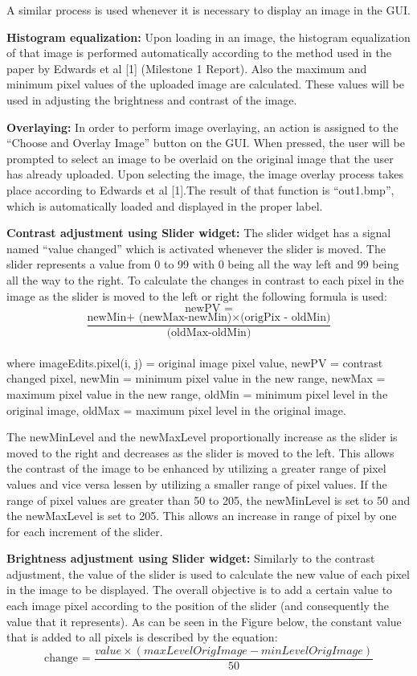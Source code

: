 \documentclass{article}
\begin{document}
\begin{multicols*}{2}
A similar process is used whenever it is necessary to display an image in the GUI.

{\bf Histogram equalization:} 
Upon loading in an image, the histogram equalization of that image is performed automatically according to the method used in the paper by Edwards et al [1] (Milestone 1 Report). Also the maximum and minimum pixel values of the uploaded image are calculated. These values will be used in adjusting the brightness and contrast of the image.

{\bf Overlaying:} 
In order to perform image overlaying, an action is assigned to the “Choose and Overlay Image” button on the GUI. When pressed, the user will be prompted to select an image to be overlaid on the original image that the user has already uploaded. Upon selecting the image, the image overlay process takes place according to  Edwards et al [1].The result of that function is “out1.bmp”, which is automatically loaded and displayed in the proper label.

{\bf Contrast adjustment using Slider widget:} 
The slider widget has a signal named “value changed” which is activated whenever the slider is moved. The slider represents a value from 0 to 99 with 0 being all the way left and 99 being all the way to the right. To calculate the changes in contrast to each pixel in the image as the slider is moved to the left or right the following formula is used:\\
\[\text{newPV }= \]
\[ \frac{ \text{newMin+ (newMax-newMin)}   \times  \text{(origPix - oldMin)}}{\text{(oldMax-oldMin)}} \] \\
where 
imageEdits.pixel(i, j) = original image pixel value,
newPV = contrast changed pixel,
newMin = minimum pixel value in the new range,
newMax = maximum pixel value in the new range,
oldMin = minimum pixel level in the original image,
oldMax = maximum pixel level in the original image.
          
The newMinLevel and the newMaxLevel proportionally increase as the slider is moved to the right and decreases as the slider is moved to the left. This allows the contrast of the image to be enhanced by utilizing a greater range of pixel values and vice versa lessen by utilizing a smaller range of pixel values. If the range of pixel values are greater than 50 to 205, the newMinLevel is set to 50 and the newMaxLevel is set to 205. This allows an increase in range of pixel by one for each increment of the slider. 

{\bf Brightness adjustment using Slider widget:} 
Similarly to the contrast adjustment, the value of the slider is used to calculate the new value of each pixel in the image to be displayed. The overall objective is to add a certain value to each image pixel according to the position of the slider (and consequently the value that it represents). As can be seen in the Figure below, the constant value that is added to all pixels is described by the equation: 
\[ \text{change =  } \frac{  value \times (maxLevelOrigImage -minLevelOrigImage) }{50}\]


\end{multicols*}
\end{document}
